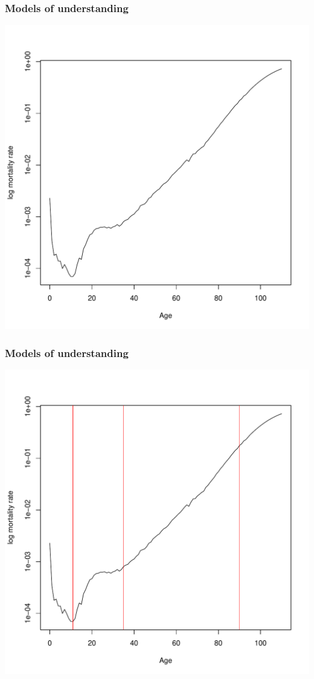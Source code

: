 \documentclass[20pt]{beamer}
\begin{document}
\begin{frame}
\frametitle{Models of understanding}
\vspace{-2em}
\begin{center}
\includegraphics{Figures/MortalityGeneral1.pdf}
\end{center}
\end{frame}

\begin{frame}
\frametitle{Models of understanding}
\vspace{-2em}
\begin{center}
\includegraphics{Figures/MortalityGeneral2.pdf}
\end{center}
\end{frame}
\end{document}
